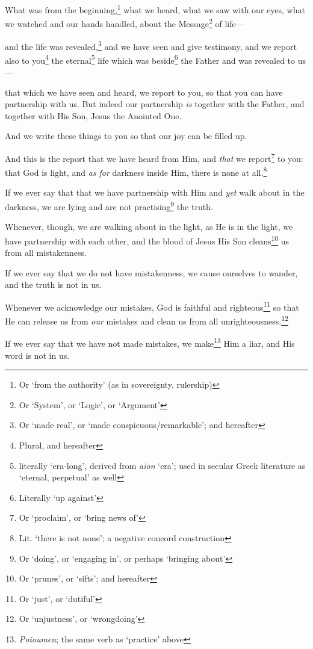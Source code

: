 \documentclass[article]{memoir}%
\newcounter{vnum}
\renewcommand*{\chapter}{
	\vspace{\baselineskip}
	\settowidth{\chapindent}{\chapnumfont 999}
	\noindent\llap{\makebox[\chapindent][l]{%
		\chapnumfont \thechapter}}%
	\addtocounter{chapter}{1}
	\setcounter{vnum}{1}
}
\newcommand{\vnum}{%
	\textsuperscript{\thevnum}%
	\addtocounter{vnum}{1}%
}
\newcommand{\infer}[1]{\textit{#1}}
\newcommand{\focus}[1]{{#1}}
\newcommand{\lxx}[2]{\textit{#1} `#2'}
\renewcommand*{\book}[1]{%
	\makebox[\textwidth][c]{\centering \booktitlefont #1}%
	\setcounter{chapter}{1}
}
\begin{document}
\book{1 John}
	
\chapter{} \vnum What was from the beginning,\footnote{Or ‘from the authority’ (as in sovereignty, rulership)} what we heard, what we saw with our eyes, what we watched and our hands handled, about the Message\footnote{Or ‘System’, or ‘Logic’, or ‘Argument’} of life---\vnum and the life was revealed,\footnote{Or `made real', or `made conspicuous/remarkable'; and hereafter} and we have seen and give testimony, and we report also to you\footnote{Plural, and hereafter} the eternal\footnote{literally `era-long', derived from \lxx{aion}{era}; used in secular Greek literature as `eternal, perpetual' as well} life which was beside\footnote{Literally ‘up against’} the Father and was revealed to us---\vnum that which we have seen and heard, we report to you, so that you can have partnership with us. But indeed our partnership \infer{is} together with the Father, and together with His Son, Jesus the Anointed One. \vnum And we write these things to you so that our joy can be filled up.

\vnum And \focus{this} is the report that we have heard from Him, and \infer{that} we report\footnote{Or `proclaim', or `bring news of'} to you: that God is light, and \infer{as for} darkness inside Him, there is none at all.\footnote{Lit. `there is not none'; a negative concord construction} \vnum If we ever say that that we have partnership with Him and \infer{yet} walk about in the darkness, we are lying and are not practising\footnote{Or `doing', or `engaging in', or perhaps `bringing about'} the truth. \vnum Whenever, though, we are walking about in the light, as He is in the light, we have partnership with each other, and the blood of Jesus His Son cleans\footnote{Or `prunes', or `sifts'; and hereafter} us from all mistakenness. \vnum If we ever say that we do not have mistakenness, we cause ourselves to wander, and the truth is not in us. \vnum Whenever we acknowledge our mistakes, God is faithful and righteous\footnote{Or `just', or `dutiful'} so that He can release us from \infer{our} mistakes and clean us from all unrighteousness.\footnote{Or `unjustness', or `wrongdoing'} \vnum If we ever say that we have not made mistakes, we make\footnote{\textit{Poioumen}; the same verb as `practice' above} Him a liar, and His word is not in us.
\end{document}
